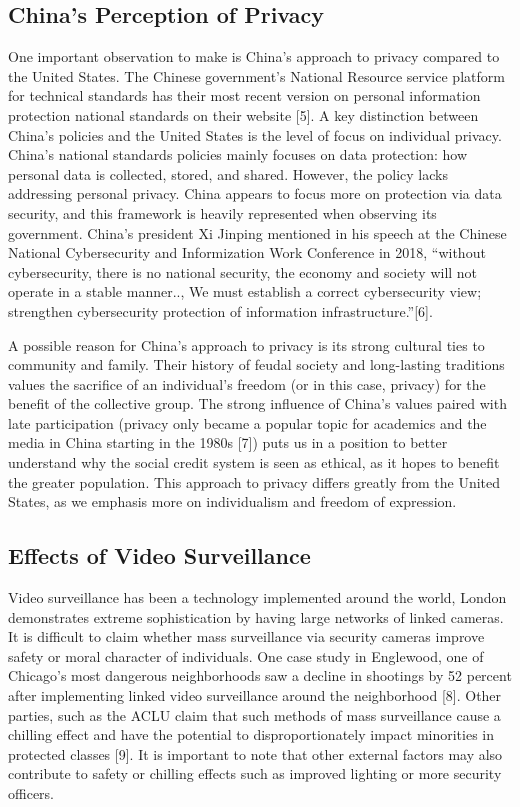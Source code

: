 \documentclass[letterpaper, 10 pt, conference]{ieeeconf}  %
\begin{document}
\subsection{China's Perception of Privacy}
One important observation to make is China’s approach to privacy compared to the United States. The Chinese government’s National Resource service platform for technical standards has their most recent version on personal information protection national standards on their website [5]. A key distinction between China’s policies and the United States is the level of focus on individual privacy. China’s national standards policies mainly focuses on data protection: how personal data is collected, stored, and shared. However, the policy lacks addressing personal privacy. China appears to focus more on protection via data security, and this framework is heavily represented when observing its government. China’s president Xi Jinping mentioned in his speech at the Chinese National Cybersecurity and Informization Work Conference in 2018, “without cybersecurity, there is no national security, the economy and society will not operate in a stable manner.., We must establish a correct cybersecurity view; strengthen cybersecurity protection of information infrastructure.”[6].

A possible reason for China’s approach to privacy is its strong cultural ties to community and family. Their history of feudal society and long-lasting traditions values the sacrifice of an individual's freedom (or in this case, privacy) for the benefit of the collective group. The strong influence of China’s values paired with late participation (privacy only became a popular topic for academics and the media in China starting in the 1980s [7]) puts us in a position to better understand why the social credit system is seen as ethical, as it hopes to benefit the greater population. This approach to privacy differs greatly from the United States, as we emphasis more on individualism and freedom of expression.

\subsection{Effects of Video Surveillance}

Video surveillance has been a technology implemented around the world, London demonstrates extreme sophistication by having large networks of linked cameras. It is difficult to claim whether mass surveillance via security cameras improve safety or moral character of individuals. One case study in Englewood, one of Chicago’s most dangerous neighborhoods saw a decline in shootings by 52 percent after implementing linked video surveillance around the neighborhood [8]. Other parties, such as the ACLU claim that such methods of mass surveillance cause a chilling effect and have the potential to disproportionately impact minorities in protected classes [9]. It is important to note that other external factors may also contribute to safety or chilling effects such as improved lighting or more security officers.
\end{document}
